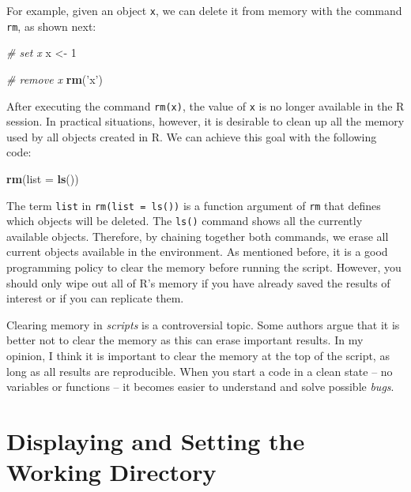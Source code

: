 \documentclass[
  12pt,
]{book}
\newenvironment{Shaded}{\begin{snugshade}}{\end{snugshade}}
\newcommand{\CommentTok}[1]{\textcolor[rgb]{0.37,0.37,0.37}{\textit{#1}}}
\newcommand{\DataTypeTok}[1]{\textcolor[rgb]{0.27,0.27,0.27}{#1}}
\newcommand{\DecValTok}[1]{\textcolor[rgb]{0.06,0.06,0.06}{#1}}
\newcommand{\KeywordTok}[1]{\textcolor[rgb]{0.27,0.27,0.27}{\textbf{#1}}}
\newcommand{\NormalTok}[1]{#1}
\newcommand{\StringTok}[1]{\textcolor[rgb]{0.5,0.5,0.5}{#1}}
\newenvironment{rmdcaution}
{\begin{cautionblock}
		
	} {\end{cautionblock}}
\begin{document}
For example, given an object \texttt{x}, we can delete it from memory with the command \texttt{rm}, as shown next: 

\begin{Shaded}
\begin{Highlighting}[]
\CommentTok{# set x}
\NormalTok{x <-}\StringTok{ }\DecValTok{1}

\CommentTok{# remove x}
\KeywordTok{rm}\NormalTok{(}\StringTok{'x'}\NormalTok{)}
\end{Highlighting}
\end{Shaded}

After executing the command \texttt{rm(\textquotesingle{}x\textquotesingle{})}, the value of \texttt{x} is no longer available in the R session. In practical situations, however, it is desirable to clean up all the memory used by all objects created in R. We can achieve this goal with the following code:

\begin{Shaded}
\begin{Highlighting}[]
\KeywordTok{rm}\NormalTok{(}\DataTypeTok{list =} \KeywordTok{ls}\NormalTok{())}
\end{Highlighting}
\end{Shaded}

The term \texttt{list} in \texttt{rm(list\ =\ ls())} is a function argument of \texttt{rm} that defines which objects will be deleted. The \texttt{ls()} command shows all the currently available objects. Therefore, by chaining together both commands, we erase all current objects available in the environment. As mentioned before, it is a good programming policy to clear the memory before running the script. However, you should only wipe out all of R's memory if you have already saved the results of interest or if you can replicate them.

\begin{rmdcaution}
Clearing memory in \emph{scripts} is a controversial topic. Some authors
argue that it is better not to clear the memory as this can erase
important results. In my opinion, I think it is important to clear the
memory at the top of the script, as long as all results are
reproducible. When you start a code in a clean state -- no variables or
functions -- it becomes easier to understand and solve possible
\emph{bugs}.
\end{rmdcaution}

\hypertarget{displaying-and-setting-the-working-directory}{%
\section{Displaying and Setting the Working Directory}\label{displaying-and-setting-the-working-directory}}
\end{document}
